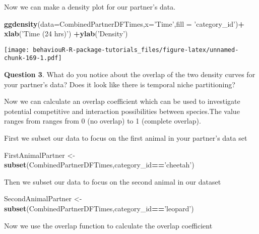 \documentclass[]{book}
\newenvironment{Shaded}{\begin{snugshade}}{\end{snugshade}}
\newcommand{\DataTypeTok}[1]{\textcolor[rgb]{0.13,0.29,0.53}{#1}}
\newcommand{\KeywordTok}[1]{\textcolor[rgb]{0.13,0.29,0.53}{\textbf{#1}}}
\newcommand{\NormalTok}[1]{#1}
\newcommand{\OperatorTok}[1]{\textcolor[rgb]{0.81,0.36,0.00}{\textbf{#1}}}
\newcommand{\StringTok}[1]{\textcolor[rgb]{0.31,0.60,0.02}{#1}}
\begin{document}
Now we can make a density plot for our partner's data.

\begin{Shaded}
\begin{Highlighting}[]
\KeywordTok{ggdensity}\NormalTok{(}\DataTypeTok{data=}\NormalTok{CombinedPartnerDFTimes,}\DataTypeTok{x=}\StringTok{'Time'}\NormalTok{,}\DataTypeTok{fill =} \StringTok{'category_id'}\NormalTok{)}\OperatorTok{+}
\StringTok{  }\KeywordTok{xlab}\NormalTok{(}\StringTok{'Time (24 hrs)'}\NormalTok{) }\OperatorTok{+}\KeywordTok{ylab}\NormalTok{(}\StringTok{'Density'}\NormalTok{)}
\end{Highlighting}
\end{Shaded}

\texttt{[image: behaviouR-R-package-tutorials\_files/figure-latex/unnamed-chunk-169-1.pdf]}

\textbf{Question 3}. What do you notice about the overlap of the two density curves for your partner's data? Does it look like there is temporal niche partitioning?

Now we can calculate an overlap coefficient which can be used to investigate potential competitive and interaction possibilities between species.The value ranges from ranges from 0 (no overlap) to 1 (complete overlap).

First we subset our data to focus on the first animal in your partner's data set

\begin{Shaded}
\begin{Highlighting}[]
\NormalTok{FirstAnimalPartner <-}\StringTok{ }\KeywordTok{subset}\NormalTok{(CombinedPartnerDFTimes,category_id}\OperatorTok{==}\StringTok{'cheetah'}\NormalTok{)}
\end{Highlighting}
\end{Shaded}

Then we subset our data to focus on the second animal in our dataset

\begin{Shaded}
\begin{Highlighting}[]
\NormalTok{SecondAnimalPartner <-}\StringTok{ }\KeywordTok{subset}\NormalTok{(CombinedPartnerDFTimes,category_id}\OperatorTok{==}\StringTok{'leopard'}\NormalTok{)}
\end{Highlighting}
\end{Shaded}

Now we use the overlap function to calculate the overlap coefficient

\begin{Shaded}
\end{Shaded}
\end{document}
